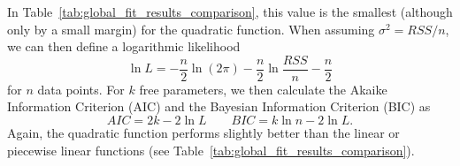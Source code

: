 \documentclass[twocolumn,apj,numberedappendix,appendixfloats]{openjournal}
\begin{document}
\begin{CJK*}{UTF8}{gbsn}
In Table~\ref{tab:global_fit_results_comparison}, this value is the smallest (although only by a small margin) for the quadratic function. When assuming $\sigma^2 = RSS / n$, we can then define a logarithmic likelihood
\begin{equation}
    \ln L = - \frac{n}{2} \ln (2 \pi) - \frac{n}{2} \ln \frac{RSS}{n} - \frac{n}{2}
\end{equation}
for $n$ data points. For $k$ free parameters, we then calculate the Akaike Information Criterion (AIC) and the Bayesian Information Criterion (BIC) as
\begin{equation} \label{eq:aic_bic}
    AIC = 2 k  - 2 \ln L \qquad BIC = k \ln n - 2 \ln L.
\end{equation}
Again, the quadratic function performs slightly better than the linear or piecewise linear functions (see Table~\ref{tab:global_fit_results_comparison}).




\end{CJK*}
\end{document}
